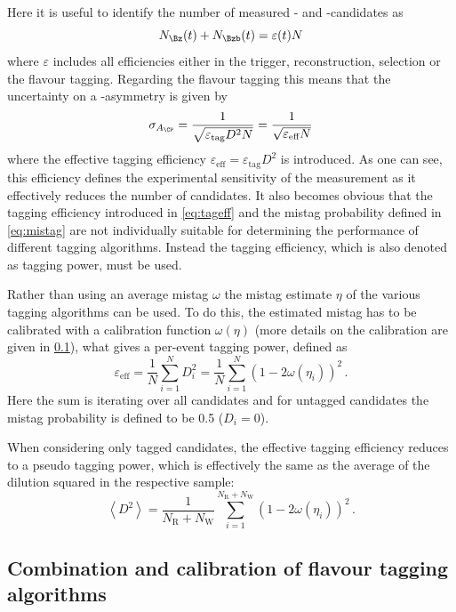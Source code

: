 Here it is useful to identify the number of measured \Bz- and \Bzb-candidates as
\begin{equation}
N_{\Bz}(t)+N_{\Bzb}(t)=\varepsilon(t)N
\end{equation}
where $\varepsilon$ includes all efficiencies either in the trigger, reconstruction, selection or the flavour tagging.
Regarding the flavour tagging this means that the uncertainty on a \CP-asymmetry is given by
\begin{equation}
\sigma_{A_{\CP}}=\frac{1}{\sqrt{\varepsilon_{\text{tag}}D^2N}}=\frac{1}{\sqrt{\varepsilon_{\text{eff}}N}}
\end{equation}
where the effective tagging efficiency $\varepsilon_{\text{eff}}=\varepsilon_{\text{tag}}D^2$ is introduced.
As one can see, this efficiency defines the experimental sensitivity of the measurement as it effectively reduces the number of candidates.
It also becomes obvious that the tagging efficiency introduced in \cref{eq:tageff} and the mistag probability defined in \cref{eq:mistag} are not individually suitable for determining the performance of different tagging algorithms.
Instead the tagging efficiency, which is also denoted as tagging power, must be used.

Rather than using an average mistag $\omega$ the mistag estimate $\eta$ of the various tagging algorithms can be used.
To do this, the estimated mistag has to be calibrated with a calibration function $\omega(\eta)$ (more details on the calibration are given in \cref{sec:CombAndCalib}), what gives a per-event tagging power, defined as
\begin{equation}
\varepsilon_{\text{eff}}=\frac{1}{N}\sum_{i=1}^{N}D_i^2=\frac{1}{N}\sum_{i=1}^{N}\left(1-2\omega(\eta_i)\right)^2\,.\label{eq:perEenttaggingpower}
\end{equation}
Here the sum is iterating over all candidates and for untagged candidates the mistag probability is defined to be \num{0.5} ($D_i=0$).

When considering only tagged candidates, the effective tagging efficiency reduces to a pseudo tagging power, which is effectively the same as the average of the dilution squared in the respective sample:
\begin{equation}
\left<D^2\right>=\frac{1}{N_{\text{R}}+N_{\text{W}}}\sum_{i=1}^{N_{\text{R}}+N_{\text{W}}}\left(1-2\omega(\eta_i)\right)^2\,.\label{eq:avgDilution}
\end{equation}

\subsection{Combination and calibration of flavour tagging algorithms}
\label{sec:CombAndCalib}

